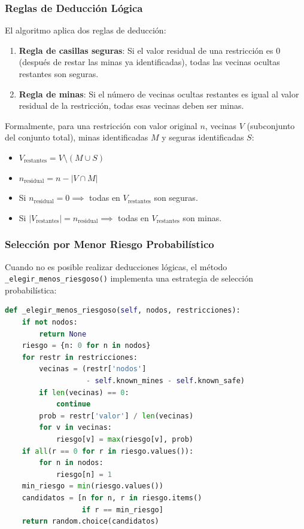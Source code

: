 \documentclass[12pt,a4paper]{article}
\begin{document}
\subsubsection{Reglas de Deducción Lógica}

El algoritmo aplica dos reglas de deducción:

\begin{enumerate}[itemsep=2pt]
    \item \textbf{Regla de casillas seguras}: Si el valor residual de una restricción es 0 (después de restar las minas ya identificadas), todas las vecinas ocultas restantes son seguras.

    \item \textbf{Regla de minas}: Si el número de vecinas ocultas restantes es igual al valor residual de la restricción, todas esas vecinas deben ser minas.
\end{enumerate}

Formalmente, para una restricción con valor original $n$, vecinas $V$ (subconjunto del conjunto total), minas identificadas $M$ y seguras identificadas $S$:
\begin{itemize}[itemsep=2pt]
    \item $V_{\text{restantes}} = V \setminus (M \cup S)$
    \item $n_{\text{residual}} = n - |V \cap M|$
    \item Si $n_{\text{residual}} = 0 \implies$ todas en $V_{\text{restantes}}$ son seguras.
    \item Si $|V_{\text{restantes}}| = n_{\text{residual}} \implies$ todas en $V_{\text{restantes}}$ son minas.
\end{itemize}

\subsubsection{Selección por Menor Riesgo Probabilístico}

Cuando no es posible realizar deducciones lógicas, el método \texttt{\_elegir\_menos\_riesgoso()} implementa una estrategia de selección probabilística:

\begin{lstlisting}[language=Python, caption={Selección de casilla de menor riesgo.}]
def _elegir_menos_riesgoso(self, nodos, restricciones):
    if not nodos:
        return None
    riesgo = {n: 0 for n in nodos}
    for restr in restricciones:
        vecinas = (restr['nodos']
                   - self.known_mines - self.known_safe)
        if len(vecinas) == 0:
            continue
        prob = restr['valor'] / len(vecinas)
        for v in vecinas:
            riesgo[v] = max(riesgo[v], prob)
    if all(r == 0 for r in riesgo.values()):
        for n in nodos:
            riesgo[n] = 1
    min_riesgo = min(riesgo.values())
    candidatos = [n for n, r in riesgo.items()
                  if r == min_riesgo]
    return random.choice(candidatos)
\end{lstlisting}
\end{document}

